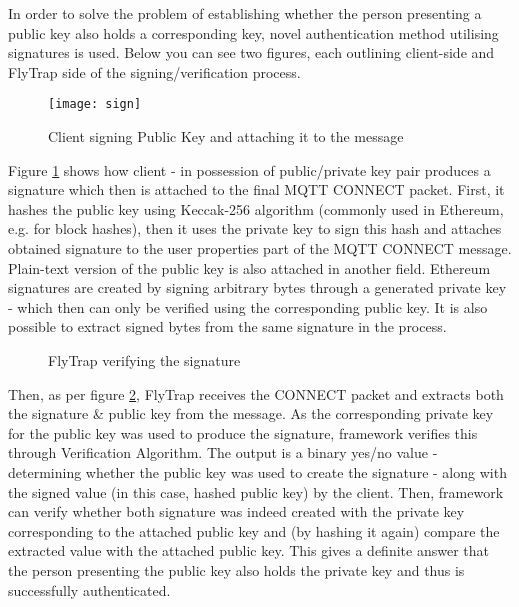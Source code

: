 In order to solve the problem of establishing whether the person presenting a public key also holds a corresponding key, novel authentication method utilising signatures is used. Below you can see two figures, each outlining client-side and FlyTrap side of the signing/verification process.

\begin{figure}[h]
    \centering
    \texttt{[image: sign]}
    \caption{Client signing Public Key and attaching it to the message}
    \label{fig:sign}
\end{figure}

Figure \ref{fig:sign} shows how client - in possession of public/private key pair produces a signature which then is attached to the final MQTT CONNECT packet. First, it hashes the public key using Keccak-256 algorithm \cite{bertoni2009keccak} (commonly used in Ethereum, e.g. for block hashes), then it uses the private key to sign this hash and attaches obtained signature to the user properties part of the MQTT CONNECT message. Plain-text version of the public key is also attached in another field. Ethereum signatures are created by signing arbitrary bytes through a generated private key - which then can only be verified using the corresponding public key. It is also possible to extract signed bytes from the same signature in the process.

\begin{figure}[h]
    \centering
    \caption{FlyTrap verifying the signature}
    \label{fig:verify}
\end{figure}

Then, as per figure \ref{fig:verify}, FlyTrap receives the CONNECT packet and extracts both the signature \& public key from the message. As the corresponding private key for the public key was used to produce the signature, framework verifies this through Verification Algorithm. The output is a binary yes/no value - determining whether the public key was used to create the signature - along with the signed value (in this case, hashed public key) by the client. Then, framework can verify whether both signature was indeed created with the private key corresponding to the attached public key and (by hashing it again) compare the extracted value with the attached public key. This gives a definite answer that the person presenting the public key also holds the private key and thus is successfully authenticated.


